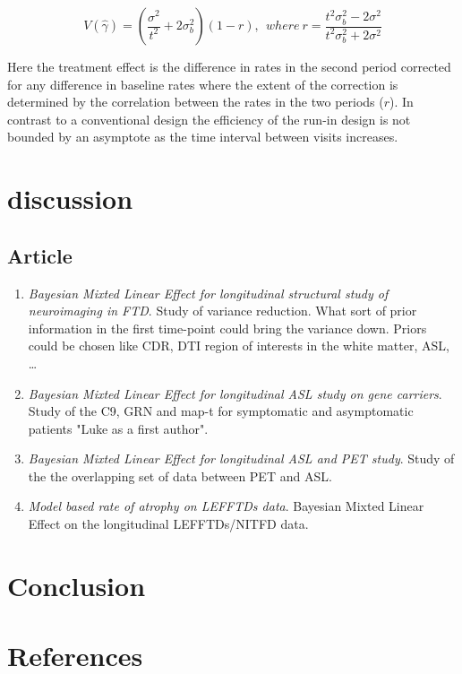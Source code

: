 \documentclass[final, paper=letter,5p,times,twocolumn]{elsarticle}
\theoremstyle{definition}
\begin{document}
{  $$
  V(\hat{\gamma}) = \left( \frac{\sigma^{2}}{t^{2}} + 2\sigma_{b}^{2} \right)(1-r),~~where~r = \frac{t^{2}\sigma_{b}^{2} - 2\sigma^{2}}{t^{2}\sigma_{b}^{2} + 2\sigma^{2}} 
  $$

Here the treatment effect is the difference in rates in the second period corrected for any difference in baseline rates where the extent of the correction is determined by the correlation between the rates in the two periods ($r$). In contrast to a conventional design the efficiency of the run-in design is not bounded by an asymptote as the time interval between visits increases.
}

\section{discussion}

\subsection{Article}

\begin{enumerate}
  \item {\it Bayesian Mixted Linear Effect for longitudinal structural study of neuroimaging in FTD}. Study of variance reduction. What sort of prior information in the first time-point could bring the variance down. Priors could be chosen like CDR, DTI region of interests in the white matter, ASL, \dots
  \item {\it Bayesian Mixted Linear Effect for longitudinal ASL study on gene carriers}. Study of the C9, GRN and map-t for symptomatic and asymptomatic patients "Luke as a first author".
  \item {\it Bayesian Mixted Linear Effect for longitudinal ASL and PET study}. Study of the the overlapping set of data between PET and ASL.
  \item {\it Model based rate of atrophy on LEFFTDs data}. Bayesian Mixted Linear Effect on the longitudinal LEFFTDs/NITFD data.
\end{enumerate}


\section{Conclusion}

\section*{References}



\end{document}
